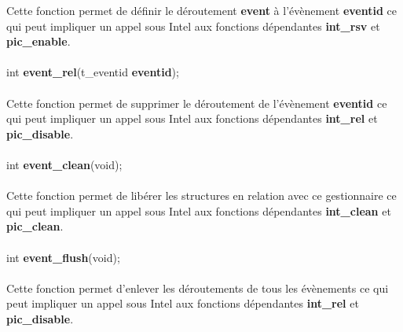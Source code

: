 \documentclass[10pt,a4wide]{article}
\begin{document}
Cette fonction permet de d\'efinir le d\'eroutement \textbf{event} \`a l'\'ev\`enement \textbf{eventid}
ce qui peut impliquer un appel sous Intel aux fonctions d\'ependantes \textbf{int\_rsv} et \textbf{pic\_enable}.

\paragraph{}

\hspace{1.5cm}int \textbf{event\_rel}(t\_eventid \textbf{eventid});

\paragraph{}

Cette fonction permet de supprimer le d\'eroutement de l'\'ev\`enement \textbf{eventid}
ce qui peut impliquer un appel sous Intel aux fonctions d\'ependantes \textbf{int\_rel} et \textbf{pic\_disable}.

\paragraph{}

\hspace{1.5cm}int \textbf{event\_clean}(void);

\paragraph{}

Cette fonction permet de lib\'erer les structures en relation avec ce gestionnaire ce qui peut impliquer un appel
sous Intel aux fonctions d\'ependantes \textbf{int\_clean} et \textbf{pic\_clean}.

\paragraph{}

\hspace{1.5cm}int \textbf{event\_flush}(void);

\paragraph{}

Cette fonction permet d'enlever les d\'eroutements de tous les \'ev\`enements ce qui peut impliquer un appel
sous Intel aux fonctions d\'ependantes \textbf{int\_rel} et \textbf{pic\_disable}.
\end{document}
